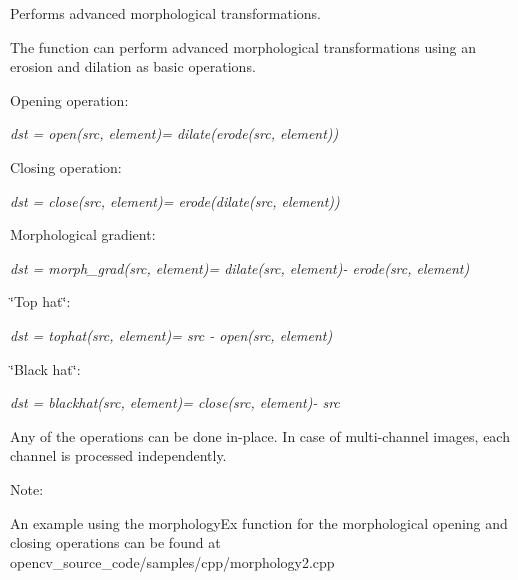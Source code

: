 Performs advanced morphological transformations.

The function can perform advanced morphological transformations using an erosion and dilation as basic operations.

Opening operation\+:

{\itshape dst = open(src, element)= dilate(erode(src, element))}

Closing operation\+:

{\itshape dst = close(src, element)= erode(dilate(src, element))}

Morphological gradient\+:

{\itshape dst = morph\+\_\+grad(src, element)= dilate(src, element)-\/ erode(src, element)}

\char`\"{}\+Top hat\char`\"{}\+:

{\itshape dst = tophat(src, element)= src -\/ open(src, element)}

\char`\"{}\+Black hat\char`\"{}\+:

{\itshape dst = blackhat(src, element)= close(src, element)-\/ src}

Any of the operations can be done in-\/place. In case of multi-\/channel images, each channel is processed independently.

Note\+:


\begin{DoxyItemize}
\item An example using the morphology\+Ex function for the morphological opening and closing operations can be found at opencv\+\_\+source\+\_\+code/samples/cpp/morphology2.\+cpp 
\end{DoxyItemize}


